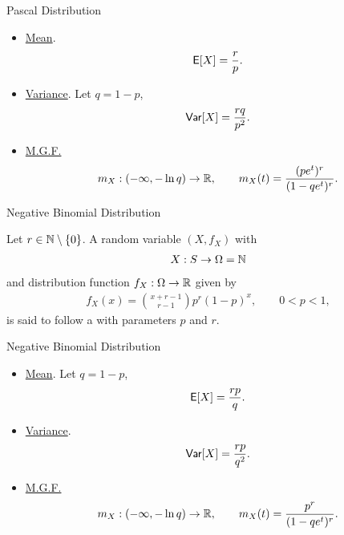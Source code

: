 \begin{frame}{Pascal Distribution}

\justifying
{} 
\begin{itemize}
	\justifying
	\item \underline{Mean}.
	\begin{align*}
	\mathsf{E}[X] = \frac{r}{p}.
	\end{align*}
	\item \underline{Variance}. Let $q = 1 - p$,
	\begin{align*}
	\mathsf{Var}[X] = \frac{rq}{p^2}.
	\end{align*}
	\item \underline{M.G.F.}
	\begin{align*}
	m_X: (-\infty, -\ln q) \rightarrow \mathbb{R}, \qquad m_X(t) = \frac{(pe^t)^r}{(1-qe^t)^r}.
	\end{align*}
\end{itemize}

\end{frame}


\begin{frame}{Negative Binomial Distribution}

\justifying
{} Let $r\in \mathbb{N}\setminus \{0\}$. A random variable $(X, f_X)$ with
\begin{align*}
X: S \rightarrow \Omega = \mathbb{N}
\end{align*}
and distribution function $f_X: \Omega\rightarrow \mathbb{R}$ given by
\begin{align*}
f_X(x) = \binom{x+r-1}{r-1} p^r(1-p)^{x}, \qquad 0 < p < 1,
\end{align*}
is said to follow a  with parameters $p$ and $r$.

\end{frame}

\begin{frame}{Negative Binomial Distribution}

\justifying
{} 
\begin{itemize}
\justifying
\item \underline{Mean}. Let $q = 1 - p$,
\begin{align*}
\mathsf{E}[X] = \frac{rp}{q}.
\end{align*}
\item \underline{Variance}.
\begin{align*}
\mathsf{Var}[X] = \frac{rp}{q^2}.
\end{align*}
\item \underline{M.G.F.}
\begin{align*}
m_X: (-\infty, -\ln q) \rightarrow \mathbb{R}, \qquad m_X(t) = \frac{p^r}{(1-qe^t)^r}.
\end{align*}
\end{itemize}

\end{frame}

